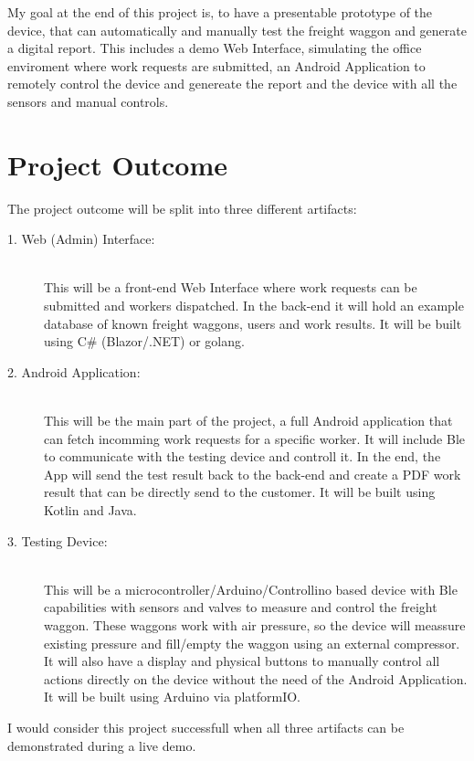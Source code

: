 \documentclass[a4paper,12pt]{article}
\begin{document}
\noindent
My goal at the end of this project is, to have a presentable prototype of the device, that can automatically and manually test the freight waggon and generate a digital report. This includes a demo Web Interface, simulating the office enviroment where work requests are submitted, an Android Application to remotely control the device and genereate the report and the device with all the sensors and manual controls.

\newpage

\section*{Project Outcome}
The project outcome will be split into three different artifacts:
\begin{description}
    \item[1. Web (Admin) Interface:] \hfill \\
        This will be a front-end Web Interface where work requests can be submitted and workers dispatched. In the back-end it will hold an example database of known freight waggons, users and work results.
        It will be built using C\# (Blazor/.NET) or golang.
    \item[2. Android Application:] \hfill \\
        This will be the main part of the project, a full Android application that can fetch incomming work requests for a specific worker. It will include Ble to communicate with the testing device and controll it. In the end, the App will send the test result back to the back-end and create a PDF work result that can be directly send to the customer.
        It will be built using Kotlin and Java.
    \item[3. Testing Device:] \hfill \\
        This will be a microcontroller/Arduino/Controllino based device with Ble capabilities with sensors and valves to measure and control the freight waggon. These waggons work with air pressure, so the device will meassure existing pressure and fill/empty the waggon using an external compressor. It will also have a display and physical buttons to manually control all actions directly on the device without the need of the Android Application.
        It will be built using Arduino via platformIO.
\end{description}
\noindent
I would consider this project successfull when all three artifacts can be demonstrated during a live demo.
\end{document}
